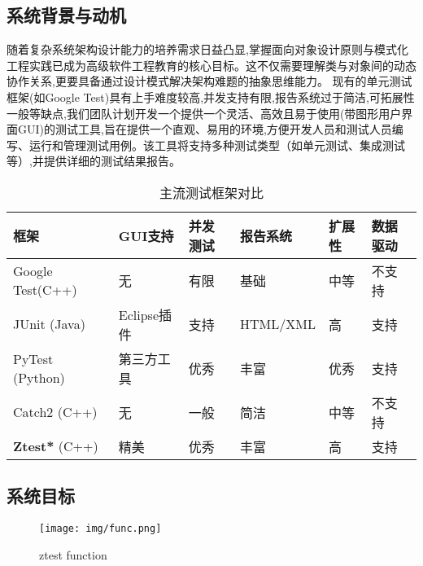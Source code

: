 \documentclass{article}
\begin{document}
\subsection{系统背景与动机}
随着复杂系统架构设计能力的培养需求日益凸显,掌握面向对象设计原则与模式化工程实践已成为高级软件工程教育的核心目标。这不仅需要理解类与对象间的动态协作关系,更要具备通过设计模式解决架构难题的抽象思维能力。
现有的单元测试框架(如Google Test)具有上手难度较高,并发支持有限,报告系统过于简洁,可拓展性一般等缺点,我们团队计划开发一个提供一个灵活、高效且易于使用(带图形用户界面GUI)的测试工具,旨在提供一个直观、易用的环境,方便开发人员和测试人员编写、运行和管理测试用例。该工具将支持多种测试类型（如单元测试、集成测试等）,并提供详细的测试结果报告。
\begin{table}[h]
    \centering
    \caption{主流测试框架对比}
    \label{tab:compare}
    \begin{tabularx}{\textwidth}{lXXXXX}
        \toprule
        \textbf{框架}              & \textbf{GUI支持} & \textbf{并发测试} & \textbf{报告系统} & \textbf{扩展性} & \textbf{数据驱动} \\
        \midrule
        Google Test(C++)         & 无              & 有限            & 基础            & 中等           & 不支持           \\
        JUnit    (Java)          & Eclipse插件      & 支持            & HTML/XML      & 高            & 支持            \\
        PyTest (Python)          & 第三方工具          & 优秀            & 丰富            & 优秀           & 支持            \\
        Catch2   (C++)           & 无              & 一般            & 简洁            & 中等           & 不支持           \\
        \textbf{Ztest*}    (C++) & 精美             & 优秀            & 丰富            & 高            & 支持            \\
        \bottomrule
    \end{tabularx}
\end{table}
\subsection{系统目标}
\begin{figure}[H]
    \centering
    \texttt{[image: img/func.png]} %
    \caption{ ztest function}
    \label{fig:ztest function }
\end{figure}
\end{document}
